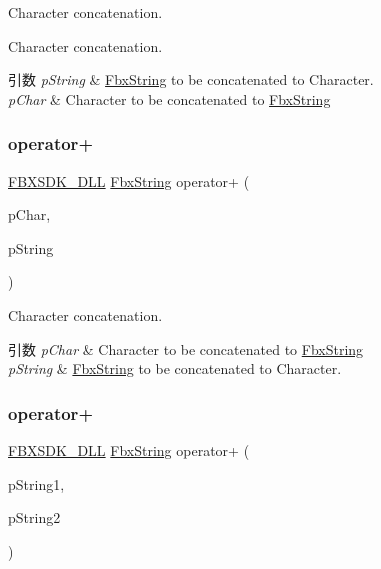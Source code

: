 Character concatenation. 

Character concatenation. 
\begin{DoxyParams}{引数}
{\em p\+String} & \hyperlink{class_fbx_string}{Fbx\+String} to be concatenated to Character. \\
\hline
{\em p\+Char} & Character to be concatenated to \hyperlink{class_fbx_string}{Fbx\+String} \\
\hline
\end{DoxyParams}
\mbox{\label{class_fbx_string_ab5928d3d3a3b0d6e39136a02c7b7014e}} 
\subsubsection{\texorpdfstring{operator+}{operator+}\hspace{0.1cm}{\footnotesize\ttfamily [3/10]}}
{\footnotesize\ttfamily \hyperlink{fbxarch_8h_a25d1298b33c31da5dbed969e0d4b4bc1}{F\+B\+X\+S\+D\+K\+\_\+\+D\+LL} \hyperlink{class_fbx_string}{Fbx\+String} operator+ (\begin{DoxyParamCaption}\item[{char}]{p\+Char,  }\item[{const \hyperlink{class_fbx_string}{Fbx\+String} \&}]{p\+String }\end{DoxyParamCaption})\hspace{0.3cm}{\ttfamily [friend]}}

Character concatenation. 
\begin{DoxyParams}{引数}
{\em p\+Char} & Character to be concatenated to \hyperlink{class_fbx_string}{Fbx\+String} \\
\hline
{\em p\+String} & \hyperlink{class_fbx_string}{Fbx\+String} to be concatenated to Character. \\
\hline
\end{DoxyParams}
\mbox{\label{class_fbx_string_a1711d58fcd5d75ee4e66ff08f3bcda05}} 
\subsubsection{\texorpdfstring{operator+}{operator+}\hspace{0.1cm}{\footnotesize\ttfamily [4/10]}}
{\footnotesize\ttfamily \hyperlink{fbxarch_8h_a25d1298b33c31da5dbed969e0d4b4bc1}{F\+B\+X\+S\+D\+K\+\_\+\+D\+LL} \hyperlink{class_fbx_string}{Fbx\+String} operator+ (\begin{DoxyParamCaption}\item[{const \hyperlink{class_fbx_string}{Fbx\+String} \&}]{p\+String1,  }\item[{const char $\ast$}]{p\+String2 }\end{DoxyParamCaption})\hspace{0.3cm}{\ttfamily [friend]}}



